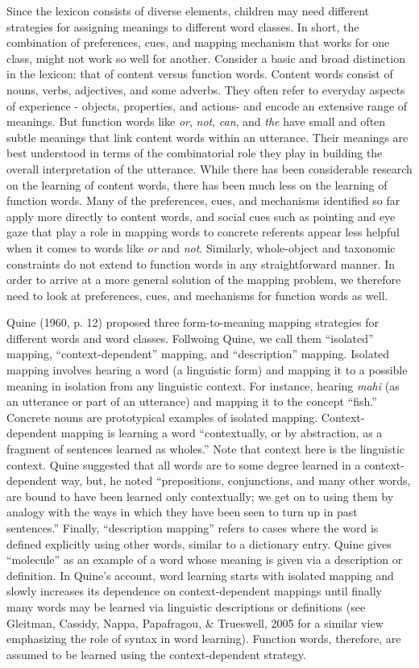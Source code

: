 \documentclass[
  english,
  ,man,floatsintext]{apa6}
\begin{document}
Since the lexicon consists of diverse elements, children may need different strategies for assigning meanings to different word classes. In short, the combination of preferences, cues, and mapping mechanism that works for one class, might not work so well for another. Consider a basic and broad distinction in the lexicon: that of content versus function words. Content words consist of nouns, verbs, adjectives, and some adverbs. They often refer to everyday aspects of experience - objects, properties, and actions- and encode an extensive range of meanings. But function words like \emph{or}, \emph{not}, \emph{can}, and \emph{the} have small and often subtle meanings that link content words within an utterance. Their meanings are best understood in terms of the combinatorial role they play in building the overall interpretation of the utterance. While there has been considerable research on the learning of content words, there has been much less on the learning of function words. Many of the preferences, cues, and mechanisms identified so far apply more directly to content words, and social cues such as pointing and eye gaze that play a role in mapping words to concrete referents appear less helpful when it comes to words like \emph{or} and \emph{not}. Similarly, whole-object and taxonomic constraints do not extend to function words in any straightforward manner. In order to arrive at a more general solution of the mapping problem, we therefore need to look at preferences, cues, and mechanisms for function words as well.

Quine (1960, p. 12) proposed three form-to-meaning mapping strategies for different words and word classes. Follwoing Quine, we call them ``isolated'' mapping, ``context-dependent'' mapping, and ``description'' mapping. Isolated mapping involves hearing a word (a linguistic form) and mapping it to a possible meaning in isolation from any linguistic context. For instance, hearing \emph{mahi} (as an utterance or part of an utterance) and mapping it to the concept ``fish.'' Concrete nouns are prototypical examples of isolated mapping. Context-dependent mapping is learning a word ``contextually, or by abstraction, as a fragment of sentences learned as wholes.'' Note that context here is the linguistic context. Quine suggested that all words are to some degree learned in a context-dependent way, but, he noted ``prepositions, conjunctions, and many other words, are bound to have been learned only contextually; we get on to using them by analogy with the ways in which they have been seen to turn up in past sentences.'' Finally, ``description mapping'' refers to cases where the word is defined explicitly using other words, similar to a dictionary entry. Quine gives ``molecule'' as an example of a word whose meaning is given via a description or definition. In Quine's account, word learning starts with isolated mapping and slowly increases its dependence on context-dependent mappings until finally many words may be learned via linguistic descriptions or definitions (see Gleitman, Cassidy, Nappa, Papafragou, \& Trueswell, 2005 for a similar view emphasizing the role of syntax in word learning). Function words, therefore, are assumed to be learned using the context-dependent strategy.
\end{document}
